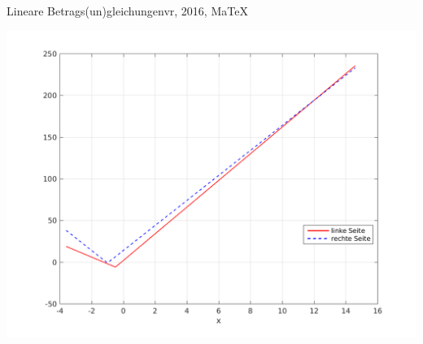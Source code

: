 \begin{MAufgabe}{Lineare Betrags(un)gleichungen}{vr, 2016, MaTeX}
 \begin{center}
 \includegraphics[width=0.8\linewidth]{Abb_zur_Ag_autogenerated_ineq_1.png} \end{center}
 
\else\relax\fi
 \end{MAufgabe}